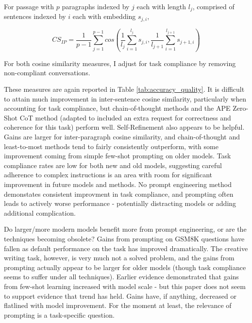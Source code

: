 \documentclass[11pt]{article}
\begin{document}
For passage with $p$ paragraphs indexed by $j$ each with length $l_{j}$, comprised of sentences indexed by $i$ each with embedding $s_{j,i}$,

\tiny $$CS_{IP}=\frac{1}{p-1}\sum_{j=1}^{p-1}cos(\frac{1}{l_{j}}\sum_{i=1}^{l_{j}}s_{j,i},\frac{1}{l_{j+1}}\sum_{i=1}^{l_{j+1}}s_{j+1,i})$$ \normalsize

For both cosine similarity measures, I adjust for task compliance by removing non-compliant conversations.

These measures are again reported in Table \ref{tab:accuracy_quality}. It is difficult to attain much improvement in inter-sentence cosine similarity, particularly when accounting for task compliance, but chain-of-thought methods and the APE Zero-Shot CoT method (adapted to included an extra request for correctness and coherence for this task) perform well. Self-Refinement also appears to be helpful. Gains are larger for inter-paragraph cosine similarity, and chain-of-thought and least-to-most methods tend to fairly consistently outperform, with some improvement coming from simple few-shot prompting on older models. Task compliance rates are low for both new and old models, suggesting careful adherence to complex instructions is an area with room for significant improvement in future models and methods. No prompt engineering method demonstates consistent improvment in task compliance, and prompting often leads to actively worse performance - potentially distracting models or adding additional complication.

Do larger/more modern models benefit more from prompt engineering, or are the techniques becoming obsolete? Gains from prompting on GSM8K questions have fallen as default performance on the task has improved dramatically. The creative writing task, however, is very much not a solved problem, and the gains from prompting actually appear to be larger for older models (though task compliance seems to suffer under all techniques). Earlier evidence demonstrated that gains from few-shot learning increased with model scale - but this paper does not seem to support evidence that trend has held. \cite{brown_language_2020} Gains have, if anything, decreased or flatlined with model improvement. For the moment at least, the relevance of prompting is a task-specific question.
\end{document}
